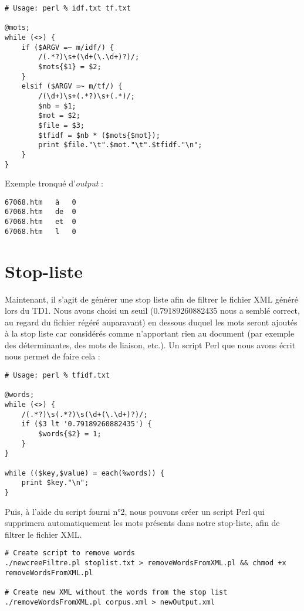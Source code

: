 \begin{lstlisting}
# Usage: perl % idf.txt tf.txt

@mots;
while (<>) {
    if ($ARGV =~ m/idf/) {
        /(.*?)\s+(\d+(\.\d+)?)/;
        $mots{$1} = $2;
    }
    elsif ($ARGV =~ m/tf/) {
        /(\d+)\s+(.*?)\s+(.*)/;
        $nb = $1;
        $mot = $2;
        $file = $3;
        $tfidf = $nb * ($mots{$mot});
        print $file."\t".$mot."\t".$tfidf."\n";
    }
}
\end{lstlisting}
\fakeshell

\medskip

\noindent Exemple tronqué d'\textit{output} :
\begin{lstlisting}
67068.htm	à	0
67068.htm	de	0
67068.htm	et	0
67068.htm	l	0
\end{lstlisting}


\section{Stop-liste}

Maintenant, il s'agit de générer une stop liste afin de filtrer le fichier XML généré lors du TD1. Nous avons choisi un seuil (0.79189260882435 nous a semblé correct, au regard du fichier régéré auparavant) en dessous duquel les mots seront ajoutés à la stop liste car considérés comme n'apportant rien au document (par exemple des déterminantes, des mots de liaison, etc.). Un script Perl que nous avons écrit nous permet de faire cela :

\perl
\begin{lstlisting}
# Usage: perl % tfidf.txt

@words;
while (<>) {
    /(.*?)\s(.*?)\s(\d+(\.\d+)?)/;
    if ($3 lt '0.79189260882435') {
        $words{$2} = 1;
    }
}

while (($key,$value) = each(%words)) {
    print $key."\n";
}
\end{lstlisting}

Puis, à l'aide du script fourni n°2, nous pouvons créer un script Perl qui supprimera automatiquement les mots présents dans notre stop-liste, afin de filtrer le fichier XML.

\fakeshell
\begin{lstlisting}
# Create script to remove words
./newcreeFiltre.pl stoplist.txt > removeWordsFromXML.pl && chmod +x removeWordsFromXML.pl

# Create new XML without the words from the stop list
./removeWordsFromXML.pl corpus.xml > newOutput.xml
\end{lstlisting}


